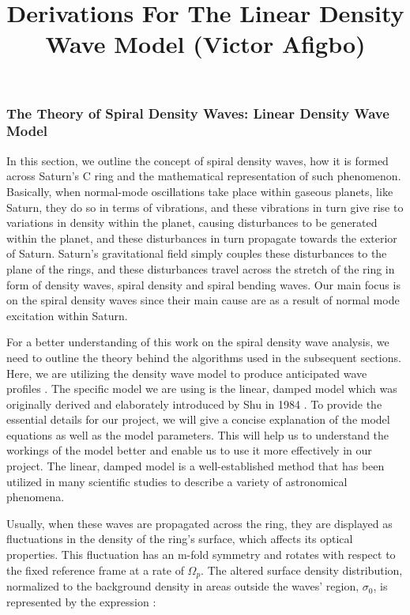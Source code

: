 \documentclass{article}
\title{Derivations For The Linear Density Wave Model (Victor Afigbo) \\[0.5ex] \large}
\begin{document}
\maketitle

\subsubsection{The Theory of Spiral Density Waves: Linear Density Wave Model}
In this section, we outline the concept of spiral density waves, how it is formed across Saturn's C ring and the mathematical representation of such phenomenon.
Basically, when normal-mode oscillations take place within gaseous planets, like Saturn, they do so in terms of vibrations, and these vibrations in turn give rise to variations in density within the planet, causing disturbances to be generated within the planet, and these disturbances in turn propagate towards the exterior of Saturn. Saturn's gravitational field simply couples these disturbances to the plane of the rings, and these disturbances travel across the stretch of the ring in form of density waves, spiral density and spiral bending waves. Our main focus is on the spiral density waves since their main cause are as a result of normal mode excitation within Saturn.


For a better understanding of this work on the spiral density wave analysis, we need to outline the theory behind the algorithms used in the subsequent sections.
Here, we are utilizing the density wave model to produce anticipated wave profiles \cite{Nicholson1990AnAR}. The specific model we are using is the linear, damped model which was originally derived and elaborately introduced by Shu in 1984 \cite{article}. To provide the essential details for our project, we will give a concise explanation of the model equations as well as the model parameters. This will help us to understand the workings of the model better and enable us to use it more effectively in our project. The linear, damped model is a well-established method that has been utilized in many scientific studies to describe a variety of astronomical phenomena.

Usually, when these waves are propagated across the ring, they are displayed as fluctuations in the density of the ring's surface, which affects its optical properties. This fluctuation has an m-fold symmetry and rotates with respect to the fixed reference frame at a rate of $\Omega_{p}$. The altered surface density distribution, normalized to the background density in areas outside the waves' region, $\sigma_{0}$, is represented by the expression \cite{Nicholson1990AnAR}:
\end{document}
